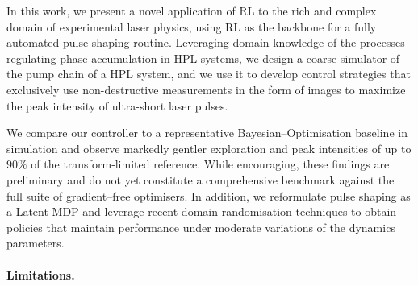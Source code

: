 In this work, we present a novel application of RL to the rich and complex domain of experimental laser physics, using RL as the backbone for a fully automated pulse-shaping routine. Leveraging domain knowledge of the processes regulating phase accumulation in HPL systems, we design a coarse simulator of the pump chain of a HPL system, and we use it to develop control strategies that exclusively use non-destructive measurements in the form of images to maximize the peak intensity of ultra-short laser pulses.

We compare our controller to a representative Bayesian–Optimisation baseline in simulation and observe markedly gentler exploration and peak intensities of up to $90\%$ of the transform‐limited reference. While encouraging, these findings are preliminary and do not yet constitute a comprehensive benchmark against the full suite of gradient–free optimisers. In addition, we reformulate pulse shaping as a Latent MDP and leverage recent domain randomisation techniques to obtain policies that maintain performance under moderate variations of the dynamics parameters.

\paragraph{Limitations.}



